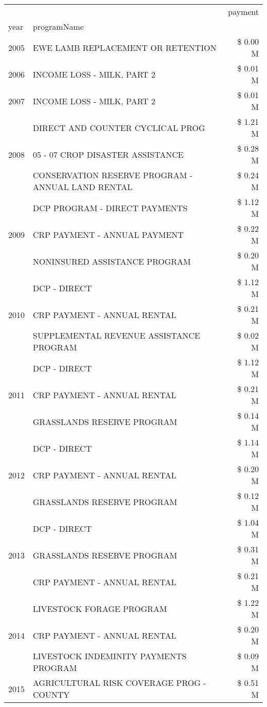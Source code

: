 \begin{tabular}{llr}
\toprule
 &  & payment \\
year & programName &  \\
\midrule
2005 & EWE LAMB REPLACEMENT OR RETENTION & \$ 0.00 M \\
\cline{1-3}
2006 & INCOME LOSS - MILK, PART 2 & \$ 0.01 M \\
\cline{1-3}
2007 & INCOME LOSS - MILK, PART 2 & \$ 0.01 M \\
\cline{1-3}
\multirow[t]{3}{*}{2008} & DIRECT AND COUNTER CYCLICAL PROG & \$ 1.21 M \\
 & 05 - 07 CROP DISASTER ASSISTANCE & \$ 0.28 M \\
 & CONSERVATION RESERVE PROGRAM - ANNUAL LAND RENTAL & \$ 0.24 M \\
\cline{1-3}
\multirow[t]{3}{*}{2009} & DCP PROGRAM - DIRECT PAYMENTS & \$ 1.12 M \\
 & CRP PAYMENT - ANNUAL PAYMENT & \$ 0.22 M \\
 & NONINSURED ASSISTANCE PROGRAM & \$ 0.20 M \\
\cline{1-3}
\multirow[t]{3}{*}{2010} & DCP - DIRECT & \$ 1.12 M \\
 & CRP PAYMENT - ANNUAL RENTAL & \$ 0.21 M \\
 & SUPPLEMENTAL REVENUE ASSISTANCE PROGRAM & \$ 0.02 M \\
\cline{1-3}
\multirow[t]{3}{*}{2011} & DCP - DIRECT & \$ 1.12 M \\
 & CRP PAYMENT - ANNUAL RENTAL & \$ 0.21 M \\
 & GRASSLANDS RESERVE PROGRAM & \$ 0.14 M \\
\cline{1-3}
\multirow[t]{3}{*}{2012} & DCP - DIRECT & \$ 1.14 M \\
 & CRP PAYMENT - ANNUAL RENTAL & \$ 0.20 M \\
 & GRASSLANDS RESERVE PROGRAM & \$ 0.12 M \\
\cline{1-3}
\multirow[t]{3}{*}{2013} & DCP - DIRECT & \$ 1.04 M \\
 & GRASSLANDS RESERVE PROGRAM & \$ 0.31 M \\
 & CRP PAYMENT - ANNUAL RENTAL & \$ 0.21 M \\
\cline{1-3}
\multirow[t]{3}{*}{2014} & LIVESTOCK FORAGE PROGRAM & \$ 1.22 M \\
 & CRP PAYMENT - ANNUAL RENTAL & \$ 0.20 M \\
 & LIVESTOCK INDEMINITY PAYMENTS PROGRAM & \$ 0.09 M \\
\cline{1-3}
\multirow[t]{3}{*}{2015} & AGRICULTURAL RISK COVERAGE PROG - COUNTY & \$ 0.51 M \\

\end{tabular}
